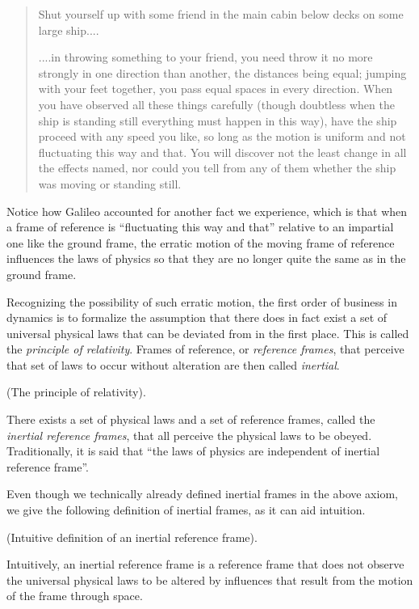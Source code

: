 \documentclass{article}
\begin{document}
\begin{quote}
    Shut yourself up with some friend in the main cabin below decks on some large ship....
    
    ....in throwing something to your friend, you need throw it no more strongly in one direction than another, the distances being equal; jumping with your feet together, you pass equal spaces in every direction. When you have observed all these things carefully (though doubtless when the ship is standing still everything must happen in this way), have the ship proceed with any speed you like, so long as the motion is uniform and not fluctuating this way and that. You will discover not the least change in all the effects named, nor could you tell from any of them whether the ship was moving or standing still.
\end{quote}

Notice how Galileo accounted for another fact we experience, which is that when a frame of reference is ``fluctuating this way and that'' relative to an impartial one like the ground frame, the erratic motion of the moving frame of reference influences the laws of physics so that they are no longer quite the same as in the ground frame.

Recognizing the possibility of such erratic motion, the first order of business in dynamics is to formalize the assumption that there does in fact exist a set of universal physical laws that can be deviated from in the first place. This is called the \textit{principle of relativity}. Frames of reference, or \textit{reference frames}, that perceive that set of laws to occur without alteration are then called \textit{inertial}.

\begin{axiom}
    (The principle of relativity).

    There exists a set of physical laws and a set of reference frames, called the \textit{inertial reference frames}, that all perceive the physical laws to be obeyed. Traditionally, it is said that ``the laws of physics are independent of inertial reference frame''.
\end{axiom}

Even though we technically already defined inertial frames in the above axiom, we give the following definition of inertial frames, as it can aid intuition.

\begin{defn}
    (Intuitive definition of an inertial reference frame).
    
    Intuitively, an inertial reference frame is a reference frame that does not observe the universal physical laws to be altered by influences that result from the motion of the frame through space.
\end{defn}
\end{document}
